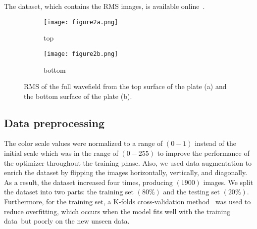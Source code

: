 \documentclass[runningheads]{llncs}
\begin{document}
The dataset, which contains the RMS images, is available online~\cite{Kudela2020d}.
\begin{figure} [h!]
	\centering
	\begin{subfigure}[b]{0.47\textwidth}
		\centering
		\texttt{[image: figure2a.png]}
		\caption{top}
		\label{fig:rmstop}
	\end{subfigure}
	\hfill
	\begin{subfigure}[b]{0.47\textwidth}
		\centering
		\texttt{[image: figure2b.png]}
		\caption{bottom}
		\label{fig:rmsbottom}
	\end{subfigure}
	\caption{RMS of the full wavefield from the top surface of the plate (a) and the bottom surface of the plate (b).}
	\label{fig:rms}
\end{figure} 
\subsection{Data preprocessing}
The color scale values were normalized to a range of \((0-1)\) instead of the initial scale which was in the range of \((0 - 255)\) to improve the performance of the optimizer throughout the training phase.
Also, we used data augmentation to enrich the dataset by flipping the images horizontally, vertically, and diagonally.
As a result, the dataset increased four times, producing \((1900)\) images.
We split the dataset into two parts: the training set \((80\%)\) and the testing set \((20\%)\).
Furthermore, for the training set, a K-folds cross-validation method~\cite{Srinivasan2019} was used to reduce overfitting, which occurs when the model fits well with the training data but poorly on the new unseen data.
\end{document}
